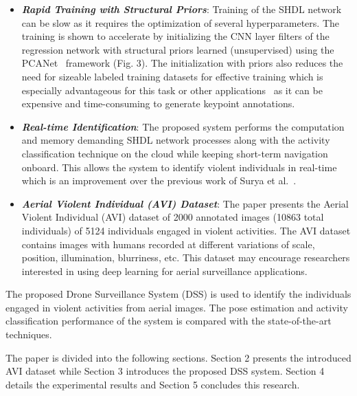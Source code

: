 \documentclass[10pt,twocolumn,letterpaper]{article}
\begin{document}
\begin{itemize}
\item \textbf{\textit{Rapid Training with Structural Priors}}: Training of the SHDL network can be slow as it requires the optimization of several hyperparameters. The training is shown to accelerate by initializing the CNN layer filters of the regression network with structural priors learned (unsupervised) using the PCANet~\cite{pcanet} framework (Fig. 3). The initialization with priors also reduces the need for sizeable labeled training datasets for effective training which is especially advantageous for this task or other applications~\cite{tsshdl,jain} as it can be expensive and time-consuming to generate keypoint annotations.

\item \textbf{\textit{Real-time Identification}}: The proposed system performs the computation and memory demanding SHDL network processes along with the activity classification technique on the cloud while keeping short-term navigation onboard. This allows the system to identify violent individuals in real-time which is an improvement over the previous work of Surya et al.~\cite{penmetsa2014autonomous}. 

\item \textbf{\textit{Aerial Violent Individual (AVI) Dataset}}: The paper presents the  Aerial Violent Individual (AVI) dataset of 2000 annotated images (10863 total individuals) of 5124 individuals engaged in violent activities. The AVI dataset contains images with humans recorded at different variations of scale, position, illumination, blurriness, etc. This dataset may encourage researchers interested in using deep learning for aerial surveillance applications.
\end{itemize}

The proposed Drone Surveillance System (DSS) is used to identify the individuals engaged in violent activities from aerial images. The pose estimation and activity classification performance of the system is compared with the state-of-the-art techniques.

The paper is divided into the following sections. Section 2 presents the introduced AVI dataset while Section 3 introduces the proposed DSS system. Section 4 details the experimental results and Section 5 concludes this research.
\end{document}
